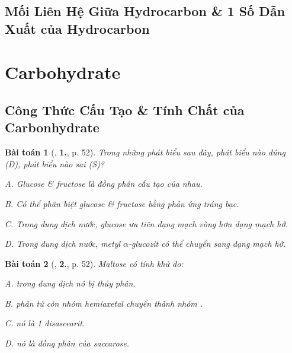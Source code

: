 \documentclass{article}
\numberwithin{equation}{section}
\newtheorem{baitoan}{Bài toán}[section]
\begin{document}

\subsection{Mối Liên Hệ Giữa Hydrocarbon \& 1 Số Dẫn Xuất của Hydrocarbon}


\newpage
\section{Carbohydrate}

\subsection{Công Thức Cấu Tạo \& Tính Chất của Carbonhydrate}

\begin{baitoan}[\cite{An2008}, \textbf{1.}, p. 52]
	Trong những phát biểu sau đây, phát biểu nào đúng (Đ), phát biểu nào sai (S)?
	\begin{enumerate*}
		\item[{\rm\sf A.}] Glucose \& fructose là đồng phân cấu tạo của nhau.
		\item[{\rm\sf B.}] Có thể phân biệt glucose \& fructose bằng phản ứng tráng bạc.
		\item[{\rm\sf C.}] Trong dung dịch nước, glucose ưu tiên dạng mạch vòng hơn dạng mạch hở.
		\item[{\rm\sf D.}] Trong dung dịch nước, metyl $\alpha$-glucozit có thể chuyển sang dạng mạch hở.
	\end{enumerate*}
\end{baitoan}

\begin{baitoan}[\cite{An2008}, \textbf{2.}, p. 52]
	Maltose có tính khử do:
	\begin{enumerate*}
		\item[{\rm\sf A.}] trong dung dịch \emph{} nó bị thủy phân.
		\item[{\rm\sf B.}] phân tử còn nhóm \emph{} hemiaxetal chuyển thành nhóm \emph{}.
		\item[{\rm\sf C.}] nó là 1 đisascearit.
		\item[{\rm\sf D.}] nó là đồng phân của saccarose.
	\end{enumerate*}
\end{baitoan}
\end{document}
